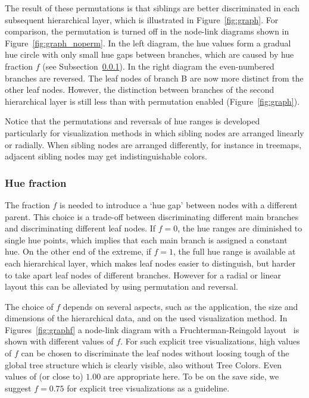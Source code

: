 \documentclass[journal]{vgtc}                %
\begin{document}
The result of these permutations is that siblings are better discriminated in each subsequent 
hierarchical layer, which is illustrated in Figure~\ref{fig:graph}. For comparison, the permutation 
is turned off in the node-link diagrams shown in Figure~\ref{fig:graph_noperm}. In the left diagram, the hue values 
form a gradual hue circle with only small hue gaps between branches, which are caused by hue fraction $f$ (see Subsection~\ref{secf}). In the right diagram the even-numbered branches are reversed. The leaf nodes of branch B are now more distinct from the other leaf nodes. However, the distinction between branches of the second hierarchical layer is still less than with permutation enabled (Figure~\ref{fig:graph}).




Notice that the permutations and reversals of hue ranges is developed particularly for visualization methods in which sibling nodes are arranged linearly or radially. When sibling nodes are arranged differently, for instance in treemaps, adjacent sibling nodes may get indistinguishable colors.

\subsubsection{Hue fraction}\label{secf}

The fraction $f$ is needed to introduce a `hue gap' between nodes with a different parent. This choice is a trade-off between discriminating different main branches and discriminating different leaf nodes. If $f=0$, the hue ranges are diminished to single hue points, which implies that each main branch is assigned a constant hue. On the other end of the extreme, if $f=1$, the full hue range is available at each hierarchical layer, which makes leaf nodes easier to distinguish, but harder to take apart leaf nodes of different branches. However for a radial or linear layout this can be alleviated by using permutation and reversal.


The choice of $f$ depends on several aspects, such as the application, the size and dimensions of the hierarchical data, and on the used visualization method. In Figures~\ref{fig:graphf} a node-link diagram with a Fruchterman-Reingold layout~\cite{Fruchterman91} is shown with different values of ${f}$. For such explicit tree visualizations, high values of ${f}$ can be chosen to discriminate the leaf nodes without loosing tough of the global tree structure which is clearly visible, also without Tree Colors. Even values of (or close to) $1.00$ are appropriate here. To be on the save side, we suggest $f=0.75$ for explicit tree visualizations as a guideline.
\end{document}
